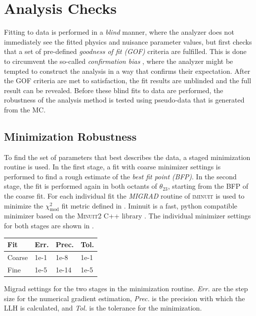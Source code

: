 \section{Analysis Checks}

Fitting to data is performed in a \textit{blind} manner, where the analyzer does not immediately see the fitted physics and nuisance parameter values, but first checks that a set of pre-defined \textit{goodness of fit (GOF)} criteria are fulfilled.
This is done to circumvent the so-called \textit{confirmation bias} , where the analyzer might be tempted to construct the analysis in a way that confirms their expectation. After the GOF criteria are met to satisfaction, the fit results are unblinded and the full result can be revealed. Before these blind fits to data are performed, the robustness of the analysis method is tested using pseudo-data that is generated from the MC.


\subsection{Minimization Robustness} 

To find the set of parameters that best describes the data, a staged minimization routine is used. In the first stage, a fit with coarse minimizer settings is performed to find a rough estimate of the \textit{best fit point (BFP)}. In the second stage, the fit is performed again in both octants of $\theta_{23}$, starting from the BFP of the coarse fit. For each individual fit the \textit{MIGRAD} routine of \textsc{iminuit}  is used to minimize the $\chi^2_{\mathrm{mod}}$ fit metric defined in . Iminuit is a fast, python compatible minimizer based on the \textsc{Minuit2} C++ library . The individual minimizer settings for both stages are shown in .

\begin{margintable}
    \small
        \begin{tabular}{ llll }
        \hline\hline
        \textbf{Fit} & \textbf{Err.} & \textbf{Prec.} & \textbf{Tol.} \\
        \hline\hline
        Coarse & 1e-1 & 1e-8 & 1e-1 \\
        Fine & 1e-5 & 1e-14 & 1e-5 \\
        \hline
        \end{tabular}
    \caption[Staged minimization routine settings]{Migrad settings for the two stages in the minimization routine. \textit{Err.} are the step size for the numerical gradient estimation, \textit{Prec.} is the precision with which the LLH is calculated, and \textit{Tol.} is the tolerance for the minimization.}
\end{margintable}

